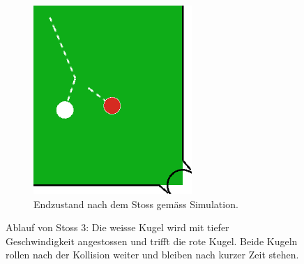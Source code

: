 \begin{figure}[h!]
\begin{subfigure}[t]{0.2\textwidth}
        \includegraphics[width=1.0\linewidth]{../common/04_results/resources/simulation_vs_reality/video_12_0205_0208_simulation_cut.png}
        \caption{Endzustand nach dem Stoss gemäss Simulation.}
        \label{fig:video_12_0205_0208_simulation}
    \end{subfigure}
    \caption{
        Ablauf von Stoss 3: Die weisse Kugel wird mit tiefer Geschwindigkeit angestossen und trifft die rote Kugel.
        Beide Kugeln rollen nach der Kollision weiter und bleiben nach kurzer Zeit stehen.
    }
    \label{fig:video_12_0205_0208}
\end{figure}

